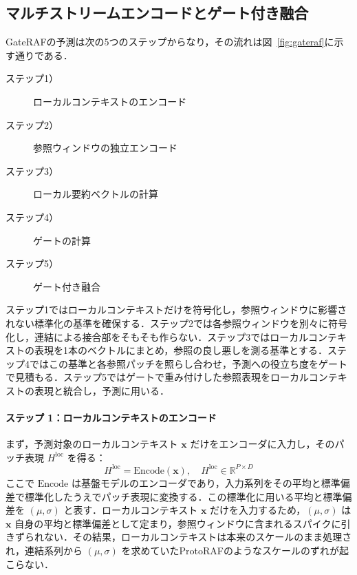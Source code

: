 \documentclass[twocolumn, lastpage]{jarticle}
\begin{document}
\subsection{マルチストリームエンコードとゲート付き融合}
GateRAFの予測は次の5つのステップからなり，その流れは図~\ref{fig:gateraf}に示す通りである．
    \begin{description}
        \item[ステップ1）] ローカルコンテキストのエンコード
        \item[ステップ2）] 参照ウィンドウの独立エンコード
        \item[ステップ3）] ローカル要約ベクトルの計算
        \item[ステップ4）] ゲートの計算
        \item[ステップ5）] ゲート付き融合
    \end{description}
ステップ1ではローカルコンテキストだけを符号化し，参照ウィンドウに影響されない標準化の基準を確保する．ステップ2では各参照ウィンドウを別々に符号化し，連結による接合部をそもそも作らない．ステップ3ではローカルコンテキストの表現を1本のベクトルにまとめ，参照の良し悪しを測る基準とする．ステップ4ではこの基準と各参照パッチを照らし合わせ，予測への役立ち度をゲートで見積もる．ステップ5ではゲートで重み付けした参照表現をローカルコンテキストの表現と統合し，予測に用いる．

    \paragraph{ステップ 1：ローカルコンテキストのエンコード}
    まず，予測対象のローカルコンテキスト $\bm{x}$ だけをエンコーダに入力し，そのパッチ表現 $H^{\mathrm{loc}}$ を得る：
        \begin{equation}
            H^{\mathrm{loc}} = \mathrm{Encode}(\bm{x}), \quad H^{\mathrm{loc}} \in \mathbb{R}^{P \times D}
        \end{equation}
    ここで $\mathrm{Encode}$ は基盤モデルのエンコーダであり，入力系列をその平均と標準偏差で標準化したうえでパッチ表現に変換する．この標準化に用いる平均と標準偏差を $(\mu, \sigma)$ と表す．ローカルコンテキスト $\bm{x}$ だけを入力するため，$(\mu, \sigma)$ は $\bm{x}$ 自身の平均と標準偏差として定まり，参照ウィンドウに含まれるスパイクに引きずられない．その結果，ローカルコンテキストは本来のスケールのまま処理され，連結系列から $(\mu, \sigma)$ を求めていたProtoRAFのようなスケールのずれが起こらない．
\end{document}
